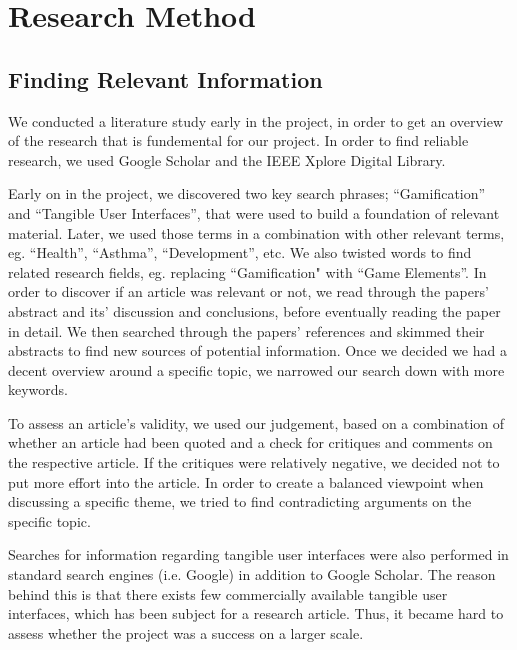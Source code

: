 \chapter{Research Method}
\label{sec:researchmethod}

\section{Finding Relevant Information}
\label{sec:literaturestudy}

We conducted a literature study early in the project, in order to get an overview of the research that is fundemental for our project. In order to find reliable research, we used Google Scholar and the IEEE Xplore Digital Library. 

Early on in the project, we discovered two key search phrases; ``Gamification'' and ``Tangible User Interfaces'', that were used to build a foundation of relevant material. Later, we used those terms in a combination with other relevant terms, eg. ``Health'', ``Asthma'', ``Development'', etc. We also twisted words to find related research fields, eg. replacing ``Gamification" with ``Game Elements''. 
In order to discover if an article was relevant or not, we read through the papers' abstract and its' discussion and conclusions, before eventually reading the paper in detail. We then searched through the papers' references and skimmed their abstracts to find new sources of potential information. Once we decided we had a decent overview around a specific topic, we narrowed our search down with more keywords.

To assess an article's validity, we used our judgement, based on a combination of whether an article had been quoted and a check for critiques and comments on the respective article. If the critiques were relatively negative, we decided not to put more effort into the article. In order to create a balanced viewpoint when discussing a specific theme, we tried to find contradicting arguments on the specific topic.  

Searches for information regarding tangible user interfaces were also performed in standard search engines (i.e. Google) in addition to Google Scholar. The reason behind this is that there exists few commercially available tangible user interfaces, which has been subject for a research article. Thus, it became hard to assess whether the project was a success on a larger scale. 
 
